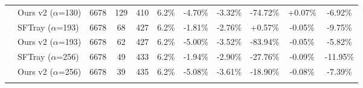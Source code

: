 \begin{table}[t]
{\begin{tabular}{ll|cccc|ccc|cc}
 & Ours v2 ($\alpha$=130) & 6678 & 129 & 410 & 6.2\% & -4.70\% & -3.32\% & -74.72\% & +0.07\% & -6.92\% \\

\addlinespace[0.3em]

 & SFTray ($\alpha$=193) & 6678 & 68 & 427 & 6.2\% & -1.81\% & -2.76\% & +0.57\% & -0.05\% & -9.75\% \\

 & Ours v2 ($\alpha$=193) & 6678 & 62 & 427 & 6.2\% & -5.00\% & -3.52\% & -83.94\% & -0.05\% & -5.82\% \\

\addlinespace[0.3em]

 & SFTray ($\alpha$=256) & 6678 & 49 & 433 & 6.2\% & -1.94\% & -2.90\% & -27.76\% & -0.09\% & -11.95\% \\

 & Ours v2 ($\alpha$=256) & 6678 & 39 & 435 & 6.2\% & -5.08\% & -3.61\% & -18.90\% & -0.08\% & -7.39\% \\

\addlinespace[0.3em]

\midrule

\bottomrule

\end{tabular}

}

\end{table}

